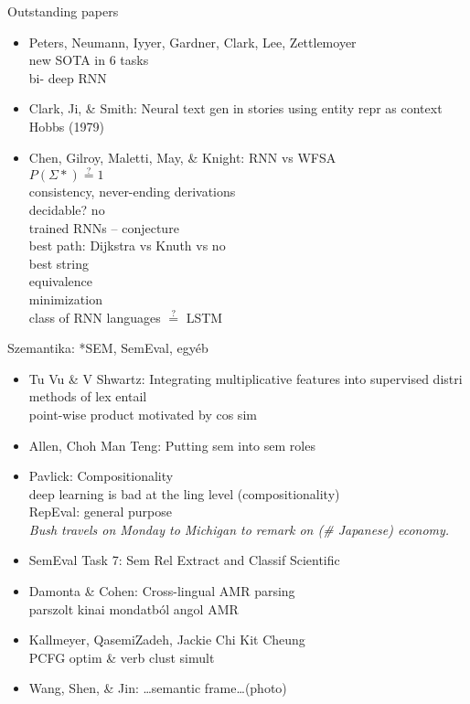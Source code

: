 \documentclass{beamer}
\begin{document}
\begin{frame}{Outstanding papers}
  \begin{itemize} 
    \item Peters, Neumann, Iyyer, Gardner, Clark, Lee, Zettlemoyer
      \\ new SOTA in 6 tasks
      \\ bi- deep RNN
    \item Clark, Ji, \& Smith: Neural text gen in stories using entity repr as context
      \\ Hobbs (1979)
    \item Chen, Gilroy, Maletti, May, \& Knight: RNN vs WFSA
      \\ $P(\Sigma*) \stackrel{?}{=} 1$
      \\ consistency, never-ending derivations
      \\ decidable? no
      \\ trained RNNs -- conjecture
      \\ best path: Dijkstra vs Knuth vs no
      \\ best string
      \\ equivalence
      \\ minimization
      \\ class of RNN languages $\stackrel ?=$ LSTM
  \end{itemize}
\end{frame}

\begin{frame}{Szemantika: *SEM, SemEval, egyéb}
  \begin{itemize}
    \item Tu Vu \& V Shwartz: 
      Integrating multiplicative features into supervised distri methods of lex entail 
              \\ point-wise product motivated by cos sim
    \item Allen, Choh Man Teng: Putting sem into sem roles 
    \item Pavlick: Compositionality
      \\ deep learning is bad at the ling level (compositionality)
      \\ RepEval: general purpose
      \\ \emph{Bush travels on Monday to Michigan to remark on (\# Japanese)
      economy.}
    \item {SemEval Task 7: Sem Rel Extract and Classif Scientific}
    \item Damonta \& Cohen: Cross-lingual AMR parsing
      \\ parszolt kinai mondatból angol AMR
    \item Kallmeyer, QasemiZadeh, Jackie Chi Kit Cheung
      \\ {PCFG optim \& verb clust} simult
    \item Wang, Shen, \& Jin: \dots semantic frame\dots  (photo) 
  \end{itemize} 
\end{frame}
\end{document}
